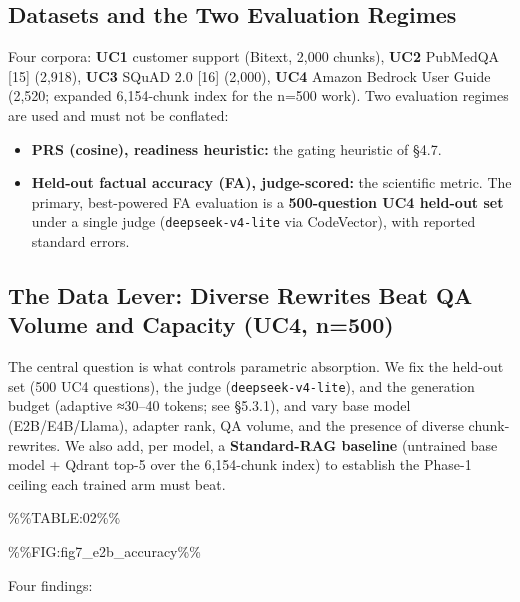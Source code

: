 \hypertarget{datasets-and-the-two-evaluation-regimes}{%
\subsection{Datasets and the Two Evaluation Regimes}\label{datasets-and-the-two-evaluation-regimes}}

Four corpora: \textbf{UC1} customer support (Bitext, 2,000 chunks), \textbf{UC2} PubMedQA {[}15{]} (2,918), \textbf{UC3} SQuAD 2.0 {[}16{]} (2,000), \textbf{UC4} Amazon Bedrock User Guide (2,520; expanded 6,154-chunk index for the n=500 work). Two evaluation regimes are used and must not be conflated:

\begin{itemize}
\tightlist
\item
  \textbf{PRS (cosine), readiness heuristic:} the gating heuristic of §4.7.
\item
  \textbf{Held-out factual accuracy (FA), judge-scored:} the scientific metric. The primary, best-powered FA evaluation is a \textbf{500-question UC4 held-out set} under a single judge (\texttt{deepseek-v4-lite} via CodeVector), with reported standard errors.
\end{itemize}

\hypertarget{the-data-lever-diverse-rewrites-beat-qa-volume-and-capacity-uc4-n500}{%
\subsection{The Data Lever: Diverse Rewrites Beat QA Volume and Capacity (UC4, n=500)}\label{the-data-lever-diverse-rewrites-beat-qa-volume-and-capacity-uc4-n500}}

The central question is what controls parametric absorption. We fix the held-out set (500 UC4 questions), the judge (\texttt{deepseek-v4-lite}), and the generation budget (adaptive ≈30--40 tokens; see §5.3.1), and vary base model (E2B/E4B/Llama), adapter rank, QA volume, and the presence of diverse chunk-rewrites. We also add, per model, a \textbf{Standard-RAG baseline} (untrained base model + Qdrant top-5 over the 6,154-chunk index) to establish the Phase-1 ceiling each trained arm must beat.

\%\%TABLE:02\%\%

\%\%FIG:fig7\_e2b\_accuracy\%\%

Four findings:

